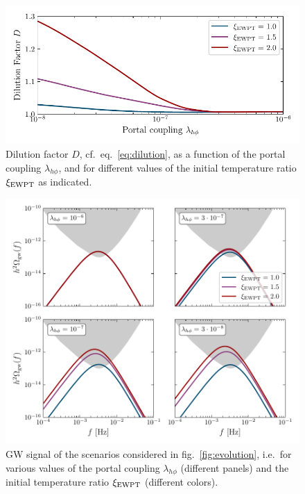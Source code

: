 \begin{figure}[t]
	\centering
	\includegraphics[width=\textwidth]{thesisplots/lisa/thesis_LISA_10}
	\caption{Dilution factor $D$, cf.~eq.~\eqref{eq:dilution}, as a function of the portal coupling $\lambda_{h\phi}$, and for different values of the initial temperature ratio $\xi_{\text{EWPT}}$ as indicated.
	}
	\label{fig:dilution}
\end{figure}

\begin{figure}[t]
	\centering
	\includegraphics[width=\textwidth]{thesisplots/lisa/thesis_LISA_11}
	\caption{\ac{GW} signal of the scenarios considered in fig.~\ref{fig:evolution}, i.e.~for various values of the portal coupling $\lambda_{h\phi}$ (different panels) and the initial temperature ratio $\xi_{\text{EWPT}}$ (different colors).}
	\label{fig:gw_with_xi}
\end{figure}

